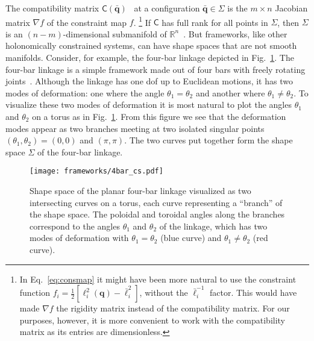 The compatibility matrix $\mathsf{C}(\bar{\bm{q}})$~\cite{pellegrino1986,lubensky2015} at a configuration $\bar{\bm{q}} \in \Sigma$ is the $m \times n$ Jacobian matrix $\nabla f$ of the constraint map $f$.%
\footnote{In Eq.~\eqref{eq:consmap} it might have been more natural to use the constraint function $f_{i} = \tfrac{1}{2}[\ell_{i}^{2}(\bm{q}) - \bar{\ell}_{i}^{2}]$, without the $\bar{\ell}_{i}^{-1}$ factor.  This would have made $\nabla f$ the rigidity matrix instead of the compatibility matrix.  For our purposes, however, it is more convenient to work with the compatibility matrix as its entries are dimensionless.}
If $\mathsf{C}$ has full rank for all points in $\Sigma$, then $\Sigma$ is an $(n - m)$-dimensional submanifold of $\mathbb{R}^{n}$~\cite{leimkuhler2005,lee2013}.
But frameworks, like other holonomically constrained systems, can have shape spaces that are not smooth manifolds.
Consider, for example, the four-bar linkage depicted in Fig.~\ref{fig:4bar_cs}.
The four-bar linkage is a simple framework made out of four bars with freely rotating joints~\cite{grashof1883,hartenberg1964,shimamoto2005}.
Although the linkage has one \ac{dof} up to Euclidean motions,
it has two modes of deformation: one where the angle $\theta_1 = \theta_2$ and another where $\theta_1 \ne \theta_2$.
To visualize these two modes of deformation it is most natural to plot the angles $\theta_{1}$ and $\theta_{2}$ on a torus as in Fig.~\ref{fig:4bar_cs}.
From this figure we see that the deformation modes appear as two branches meeting at two isolated singular points $(\theta_1,\theta_2) = (0,0)$ and $(\pi,\pi)$.
The two curves put together form the shape space $\Sigma$ of the four-bar linkage.
%
\begin{figure}
  \begin{center}
    \texttt{[image: frameworks/4bar\_cs.pdf]}
  \end{center}
  \caption{Shape space of the planar four-bar linkage visualized as two intersecting curves on a torus, each curve representing a ``branch'' of the shape space.
    The poloidal and toroidal angles along the branches correspond to the angles $\theta_1$ and $\theta_2$ of the linkage, which has two modes of deformation with $\theta_{1} = \theta_{2}$ (blue curve) and $\theta_{1} \ne \theta_{2}$ (red curve).}
  \label{fig:4bar_cs}
\end{figure}
\label{page:4bar}


